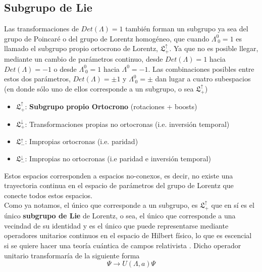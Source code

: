 \documentclass[12pt,letterpaper]{article}
\begin{document}
\subsection{Subgrupo de Lie}
Las transformaciones de $Det(\Lambda)=1$ también forman un subgrupo ya sea del grupo de Poincaré o del grupo de Lorentz homogéneo, que cuando $\Lambda^0_{\; 0} =1$ es llamado el subgrupo propio ortocrono de Lorentz, $\mathfrak{{L}}^\uparrow_+$. Ya que no es posible llegar, mediante un cambio de parámetros continuo, desde $Det(\Lambda)=1$ hacia $Det(\Lambda)=-1$ o desde $\Lambda^0_{\;0}=1$ hacia $\Lambda^0_{\;}=-1$.
Las combinaciones posibles entre estos dos parámetros, $Det(\Lambda)=\pm1$ y $\Lambda^0_{\;0}=\pm$ dan lugar a cuatro subespacios (en donde sólo uno de ellos corresponde a un subgrupo, o sea $\mathfrak{{L}}_+^\uparrow$)
\begin{itemize}
  \item $\mathfrak{{L}}^\uparrow_+$: \textbf{Subgrupo propio Ortocrono} (rotaciones + boosts)
  \item $\mathfrak{{L}}^\downarrow_+$: Transformaciones propias no ortocronas (i.e. inversión temporal)
  \item $\mathfrak{{L}}^\uparrow_-$: Impropias ortocronas (i.e. paridad)
  \item $\mathfrak{{L}}^\downarrow_-$: Impropias no ortocronas (i.e paridad e inversión temporal)
\end{itemize}
Estos espacios corresponden a espacios no-conexos, es decir, no existe una trayectoria continua en el espacio de parámetros del grupo de Lorentz que conecte todos estos espacios. \\
Como ya notamos, el único que corresponde a un subgrupo, es $\mathfrak{{L}}^\uparrow_+$ que en sí es el único \textbf{subgrupo de Lie} de Lorentz, o sea, el único que corresponde a una vecindad de su identidad y es el único que puede representarse mediante operadores unitarios continuos en el espacio de Hilbert físico, lo que es escencial si se quiere hacer una teoría cuántica de campos relativista \cite{weinberg-v1}. Dicho operador unitario transformaría de la siguiente forma
\begin{equation}
  \Psi \rightarrow U(\Lambda,a)\Psi
\end{equation}
\end{document}
